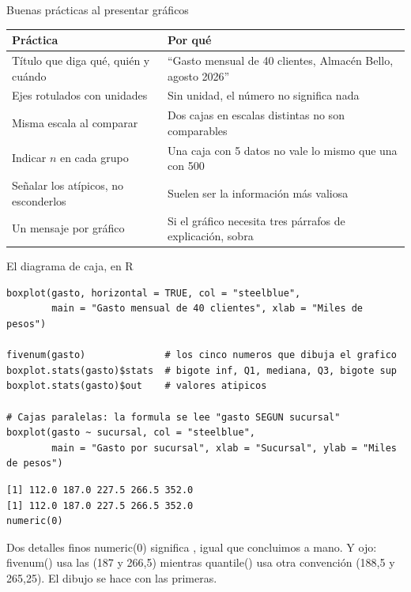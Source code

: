 \documentclass[aspectratio=169,10pt]{beamer}
\newcommand{\fx}[1]{{\ttfamily\color{uniAzul}#1}}
\begin{document}
\begin{frame}{Buenas prácticas al presentar gráficos}
  \scriptsize
  \begin{center}
  \begin{tabular}{@{}p{4.4cm}p{7.4cm}@{}}
    \toprule
    \textbf{Práctica} & \textbf{Por qué} \\
    \midrule
    Título que diga qué, quién y cuándo &
      ``Gasto mensual de 40 clientes, Almacén Bello, agosto 2026'' \\
    Ejes rotulados con unidades &
      Sin unidad, el número no significa nada \\
    Misma escala al comparar &
      Dos cajas en escalas distintas no son comparables \\
    Indicar $n$ en cada grupo &
      Una caja con 5 datos no vale lo mismo que una con 500 \\
    Señalar los atípicos, no esconderlos &
      Suelen ser la información más valiosa \\
    Un mensaje por gráfico &
      Si el gráfico necesita tres párrafos de explicación, sobra \\
    \bottomrule
  \end{tabular}
  \end{center}
\end{frame}

\begin{frame}[fragile]{El diagrama de caja, en R}
  \scriptsize
\begin{lstlisting}[style=Rmini]
boxplot(gasto, horizontal = TRUE, col = "steelblue",
        main = "Gasto mensual de 40 clientes", xlab = "Miles de pesos")

fivenum(gasto)              # los cinco numeros que dibuja el grafico
boxplot.stats(gasto)$stats  # bigote inf, Q1, mediana, Q3, bigote sup
boxplot.stats(gasto)$out    # valores atipicos

# Cajas paralelas: la formula se lee "gasto SEGUN sucursal"
boxplot(gasto ~ sucursal, col = "steelblue",
        main = "Gasto por sucursal", xlab = "Sucursal", ylab = "Miles de pesos")
\end{lstlisting}
\begin{lstlisting}[style=Rout]
[1] 112.0 187.0 227.5 266.5 352.0
[1] 112.0 187.0 227.5 266.5 352.0
numeric(0)
\end{lstlisting}

  \vspace{-0.1cm}
  \begin{alertblock}{Dos detalles finos}
    \tiny
    \fx{numeric(0)} significa , igual que concluimos a
    mano. Y ojo: \fx{fivenum()} usa las  (187 y 266,5)
    mientras \fx{quantile()} usa otra convención (188,5 y 265,25). El dibujo se
    hace con las primeras.
  \end{alertblock}
\end{frame}
\end{document}
